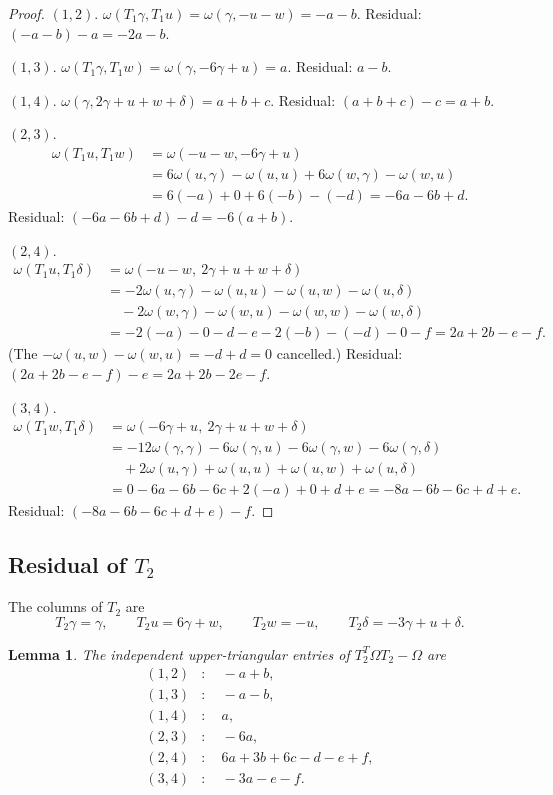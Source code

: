 \documentclass[11pt,a4paper]{article}
\newtheorem{lemma}[theorem]{Lemma}
\theoremstyle{definition}
\theoremstyle{remark}
\begin{document}
\begin{proof}
$(1,2)$. $\omega(T_1\gamma,T_1u)=\omega(\gamma,-u-w)=-a-b$. Residual: $(-a-b)-a=-2a-b$.

$(1,3)$. $\omega(T_1\gamma,T_1w)=\omega(\gamma,-6\gamma+u)=a$. Residual: $a-b$.

$(1,4)$. $\omega(\gamma,2\gamma+u+w+\delta)=a+b+c$. Residual: $(a+b+c)-c=a+b$.

$(2,3)$.
\begin{align*}
\omega(T_1u,T_1w)
&=\omega(-u-w,-6\gamma+u)\\
&=6\omega(u,\gamma)-\omega(u,u)+6\omega(w,\gamma)-\omega(w,u)\\
&=6(-a)+0+6(-b)-(-d)=-6a-6b+d.
\end{align*}
Residual: $(-6a-6b+d)-d=-6(a+b)$.

$(2,4)$.
\begin{align*}
\omega(T_1u,T_1\delta)
&=\omega(-u-w,\ 2\gamma+u+w+\delta)\\
&=-2\omega(u,\gamma)-\omega(u,u)-\omega(u,w)-\omega(u,\delta)\\
&\quad-2\omega(w,\gamma)-\omega(w,u)-\omega(w,w)-\omega(w,\delta)\\
&=-2(-a)-0-d-e-2(-b)-(-d)-0-f=2a+2b-e-f.
\end{align*}
(The $-\omega(u,w)-\omega(w,u)=-d+d=0$ cancelled.) Residual: $(2a+2b-e-f)-e=2a+2b-2e-f$.

$(3,4)$.
\begin{align*}
\omega(T_1w,T_1\delta)
&=\omega(-6\gamma+u,\ 2\gamma+u+w+\delta)\\
&=-12\omega(\gamma,\gamma)-6\omega(\gamma,u)-6\omega(\gamma,w)-6\omega(\gamma,\delta)\\
&\quad+2\omega(u,\gamma)+\omega(u,u)+\omega(u,w)+\omega(u,\delta)\\
&=0-6a-6b-6c+2(-a)+0+d+e=-8a-6b-6c+d+e.
\end{align*}
Residual: $(-8a-6b-6c+d+e)-f$.
\end{proof}

\subsection{Residual of $T_2$}

The columns of $T_2$ are
\[
T_2\gamma=\gamma,\qquad T_2u=6\gamma+w,\qquad T_2w=-u,\qquad T_2\delta=-3\gamma+u+\delta.
\]

\begin{lemma}\label{lem:T2res}
The independent upper-triangular entries of $T_2^T\Omega T_2-\Omega$ are
\begin{align*}
(1,2)&:\quad -a+b,\\
(1,3)&:\quad -a-b,\\
(1,4)&:\quad a,\\
(2,3)&:\quad -6a,\\
(2,4)&:\quad 6a+3b+6c-d-e+f,\\
(3,4)&:\quad -3a-e-f.
\end{align*}
\end{lemma}
\end{document}
